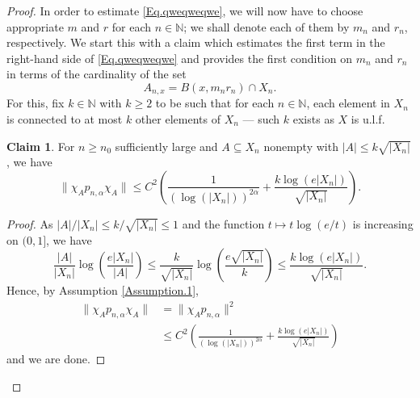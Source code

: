 \documentclass[11pt]{amsart}
\newcommand{\N}{\mathbb{N}}
\numberwithin{equation}{section}
\theoremstyle{definition}
\newtheorem{claim}[theorem]{Claim}
\theoremstyle{remark}
\begin{document}
\begin{proof}
In order to estimate \eqref{Eq.qweqweqwe}, we will now have to choose appropriate $m$ and $r$  for each $n\in\N$; we shall denote each of them by $m_n$ and $r_n$, respectively. We start this with a claim which estimates the first term in the right-hand side of \eqref{Eq.qweqweqwe} and provides the first condition on $m_n$ and $r_n$ in terms of the cardinality of the set \begin{equation}\label{Eq.SetAn}A_{n,x}=B(x,m_nr_n)\cap X_n.\end{equation}
For this,   fix $k\in\N$ with $k\geq2$ to be such that for each $n\in\N$, each element in $X_n$ is connected to at most $k$ other elements of $X_n$ --- such $k$ exists as $X$ is u.l.f.


\begin{claim}\label{Claim.ddd.q}
For  $n\geq n_0$ sufficiently large   and   $A\subseteq X_n$   nonempty with $|A|\leq k\sqrt{|X_n|}$, we have \[
\|\chi_Ap_{n,\alpha}\chi_A\|\leq C^2\left(\frac{1}{(\log(|X_n|))^ {2\alpha}}+\frac{k\log(e|X_n|)}{\sqrt{|X_n|}}\right).
\]
\end{claim}


\begin{proof}
 As $|A|/|X_n|\leq k/\sqrt{|X_n|}\leq 1$ and the function $t\mapsto t\log(e/t)$ is increasing on $(0,1]$, we have
\[
\frac{|A|}{|X_n|}\log\left(\frac{e |X_n|}{|A|}\right)\leq\frac{k}{\sqrt {|X_n|}}\log\left(\frac{e\sqrt{|X_n|}}{k}\right)\leq\frac{k\log(e |X_n|)}{\sqrt{|X_n|}}.
\]
Hence, by Assumption \ref{Assumption.1},
\begin{align*}
\|\chi_Ap_{n,\alpha}\chi_A\| &=\|\chi_Ap_{n,\alpha}\|^2\\
&\leq C^2\left(\frac{1}{(\log (|X_n|))^ {2\alpha}}+\frac{k\log(e|X_n|)}{\sqrt{|X_n|}}\right)
\end{align*}
and we are done.
\end{proof}



\end{proof}
\end{document}
